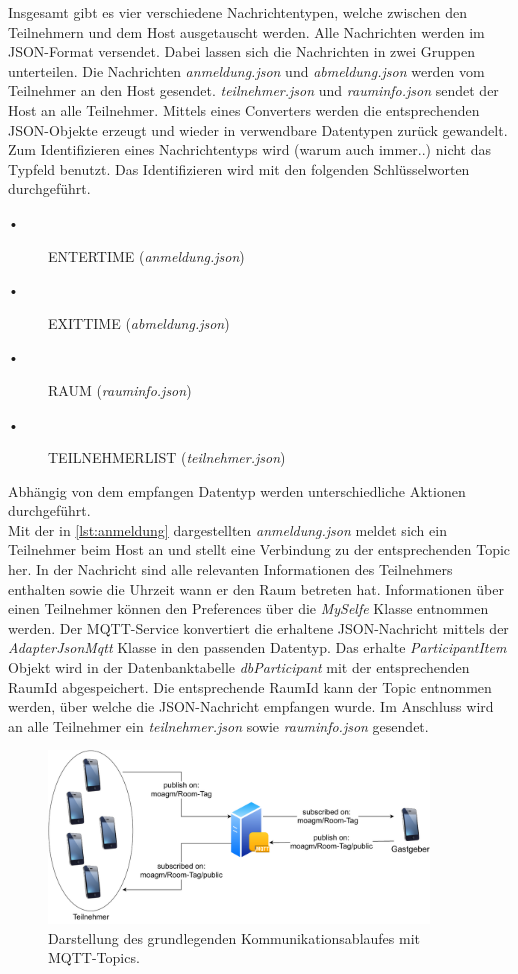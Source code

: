 Insgesamt gibt es vier verschiedene Nachrichtentypen, welche zwischen den Teilnehmern und dem Host ausgetauscht werden. Alle Nachrichten werden im JSON-Format versendet. 
Dabei lassen sich die Nachrichten in zwei Gruppen unterteilen.
Die Nachrichten \textit{anmeldung.json} und \textit{abmeldung.json} werden vom Teilnehmer an den Host gesendet. 
\textit{teilnehmer.json} und \textit{rauminfo.json} sendet der Host an alle Teilnehmer. 
Mittels eines Converters werden die entsprechenden JSON-Objekte erzeugt und wieder in verwendbare Datentypen zurück gewandelt. 
Zum Identifizieren eines Nachrichtentyps wird (warum auch immer..) nicht das Typfeld benutzt. 
Das Identifizieren wird mit den folgenden Schlüsselworten durchgeführt.
\begin{description}
\item[•] ENTERTIME (\textit{anmeldung.json})
\item[•] EXITTIME (\textit{abmeldung.json})
\item[•] RAUM (\textit{rauminfo.json})
\item[•] TEILNEHMERLIST (\textit{teilnehmer.json})
\end{description}
Abhängig von dem empfangen Datentyp werden unterschiedliche Aktionen durchgeführt.
\\
Mit der in \cref{lst:anmeldung} dargestellten \textit{anmeldung.json} meldet sich ein Teilnehmer beim Host an und stellt eine Verbindung zu der entsprechenden Topic her. In der Nachricht sind alle relevanten Informationen des Teilnehmers enthalten sowie die Uhrzeit wann er den Raum betreten hat.
Informationen über einen Teilnehmer können den Preferences über die \textit{MySelfe} Klasse entnommen werden. 
Der MQTT-Service konvertiert die erhaltene JSON-Nachricht mittels der \textit{AdapterJsonMqtt} Klasse in den passenden Datentyp. 
Das erhalte \textit{ParticipantItem} Objekt wird in der Datenbanktabelle \textit{dbParticipant} mit der  entsprechenden RaumId abgespeichert. 
Die entsprechende RaumId kann der Topic entnommen werden, über welche die JSON-Nachricht empfangen wurde. 
Im Anschluss wird an alle Teilnehmer ein \textit{teilnehmer.json} sowie \textit{rauminfo.json} gesendet.
\begin{figure}
	\centering
	\includegraphics[width =0.9\textwidth]{images/mqttservice.pdf}
	\caption{Darstellung des grundlegenden Kommunikationsablaufes mit MQTT-Topics.}
	\label{img:mqtt}
\end{figure}
